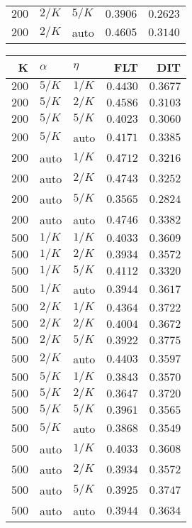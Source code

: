 \begin{table}
\begin{spacing}{1.2}
{\begin{tabular}{rll|rr}
$200$ &  $2/K$ &  $5/K$ &         $0.3906$ & $0.2623$ \\
$200$ &  $2/K$ &   auto &         $0.4605$ & $0.3140$ \\
\bottomrule
\end{tabular}
} \hfill \parbox{.45\linewidth}{\centering \begin{tabular}{rll|rr}
\toprule
    K &  $\alpha$ &    $\eta$ & FLT &        DIT \\
\midrule
$200$ &  $5/K$ &  $1/K$ &         $0.4430$ &      $0.3677$ \\
$200$ &  $5/K$ &  $2/K$ &         $0.4586$ &      $0.3103$ \\
$200$ &  $5/K$ &  $5/K$ &         $0.4023$ &      $0.3060$ \\
$200$ &  $5/K$ &   auto &         $0.4171$ &      $0.3385$ \\
$200$ &   auto &  $1/K$ &         $0.4712$ &      $0.3216$ \\
$200$ &   auto &  $2/K$ &         $0.4743$ &      $0.3252$ \\
$200$ &   auto &  $5/K$ &         $0.3565$ &      $0.2824$ \\
$200$ &   auto &   auto &         $0.4746$ &      $0.3382$ \\
\myrowcolor $500$ &  $1/K$ &  $1/K$ &         $0.4033$ &      $0.3609$ \\
$500$ &  $1/K$ &  $2/K$ &         $0.3934$ &      $0.3572$ \\
$500$ &  $1/K$ &  $5/K$ &         $0.4112$ &      $0.3320$ \\
$500$ &  $1/K$ &   auto &         $0.3944$ &      $0.3617$ \\
$500$ &  $2/K$ &  $1/K$ &         $0.4364$ &      $0.3722$ \\
$500$ &  $2/K$ &  $2/K$ &         $0.4004$ &      $0.3672$ \\
$500$ &  $2/K$ &  $5/K$ &         $0.3922$ & $\bm{0.3775}$ \\
$500$ &  $2/K$ &   auto &         $0.4403$ &      $0.3597$ \\
$500$ &  $5/K$ &  $1/K$ &         $0.3843$ &      $0.3570$ \\
$500$ &  $5/K$ &  $2/K$ &         $0.3647$ &      $0.3720$ \\
$500$ &  $5/K$ &  $5/K$ &         $0.3961$ &      $0.3565$ \\
$500$ &  $5/K$ &   auto &         $0.3868$ &      $0.3549$ \\
$500$ &   auto &  $1/K$ &         $0.4033$ &      $0.3608$ \\
$500$ &   auto &  $2/K$ &         $0.3934$ &      $0.3572$ \\
$500$ &   auto &  $5/K$ &         $0.3925$ &      $0.3747$ \\
$500$ &   auto &   auto &         $0.3944$ &      $0.3634$ \\
\bottomrule
\end{tabular}
}
\end{spacing}
\end{table}
